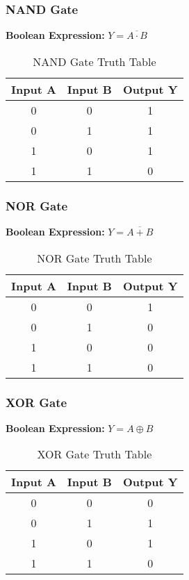 \documentclass[11pt]{article}
\begin{document}
\subsubsection{NAND Gate}
\textbf{Boolean Expression:} $Y = \overline{A \cdot B}$
\begin{table}[htbp]
    \centering
    \caption{NAND Gate Truth Table}
    \begin{tabular}{cc c}
        \toprule
        \textbf{Input A} & \textbf{Input B} & \textbf{Output Y} \\ \midrule
        0 & 0 & 1 \\
        0 & 1 & 1 \\
        1 & 0 & 1 \\
        1 & 1 & 0 \\ \bottomrule
    \end{tabular}
\end{table}

\subsubsection{NOR Gate}
\textbf{Boolean Expression:} $Y = \overline{A + B}$
\begin{table}[htbp]
    \centering
    \caption{NOR Gate Truth Table}
    \begin{tabular}{cc c}
        \toprule
        \textbf{Input A} & \textbf{Input B} & \textbf{Output Y} \\ \midrule
        0 & 0 & 1 \\
        0 & 1 & 0 \\
        1 & 0 & 0 \\
        1 & 1 & 0 \\ \bottomrule
    \end{tabular}
\end{table}

\subsubsection{XOR Gate}
\textbf{Boolean Expression:} $Y = A \oplus B$
\begin{table}[htbp]
    \centering
    \caption{XOR Gate Truth Table}
    \begin{tabular}{cc c}
        \toprule
        \textbf{Input A} & \textbf{Input B} & \textbf{Output Y} \\ \midrule
        0 & 0 & 0 \\
        0 & 1 & 1 \\
        1 & 0 & 1 \\
        1 & 1 & 0 \\ \bottomrule
    \end{tabular}
\end{table}
\end{document}
